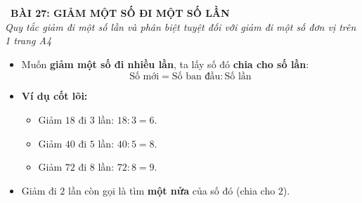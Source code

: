 \documentclass[11pt,a4paper]{article}
\begin{document}
\begin{tcolorbox}[
  enhanced,
  colback=white,
  colframe=primary,
  arc=3mm,
  boxrule=1.2pt,
  left=4mm, right=4mm, top=2.5mm, bottom=2.5mm,
  drop shadow=black!10!white
]
  \centering
  {\Large\bfseries\color{primary}\faBookmark\ BÀI 27: GIẢM MỘT SỐ ĐI MỘT SỐ LẦN}\\[1.5mm]
  {\small\itshape\color{black!75}Quy tắc giảm đi một số lần và phân biệt tuyệt đối với giảm đi một số đơn vị trên 1 trang A4}
\end{tcolorbox}

\vspace{-2mm}


\noindent
\begin{minipage}[t]{0.49\textwidth}\vspace{0pt}
\begin{tcolorbox}[
  enhanced,
  colback=blue!4!white,
  colframe=blue!75!black,
  arc=2mm, boxrule=0.8pt,
  left=2mm, right=2mm, top=1.8mm, bottom=1.8mm,
  title={\footnotesize\bfseries\color{white}\faKey\ 1. Quy tắc Giảm đi một số lần}
]
{\footnotesize
\begin{itemize}\setlength{\itemsep}{1.5pt}\setlength{\leftskip}{-2.5mm}
  \item Muốn \textbf{giảm một số đi nhiều lần}, ta lấy số đó \textbf{chia cho số lần}:
  $$\text{Số mới} = \text{Số ban đầu} : \text{Số lần}$$
  \item \textbf{Ví dụ cốt lõi:}
  \begin{itemize}\setlength{\itemsep}{1pt}\setlength{\leftskip}{-2.5mm}
    \item Giảm $18$ đi $3$ lần: $18 : 3 = 6$.
    \item Giảm $40$ đi $5$ lần: $40 : 5 = 8$.
    \item Giảm $72$ đi $8$ lần: $72 : 8 = 9$.
  \end{itemize}
  \item Giảm đi $2$ lần còn gọi là tìm \textbf{một nửa} của số đó (chia cho $2$).
\end{itemize}
}
\end{tcolorbox}
\end{minipage}
\hfill
\end{document}
